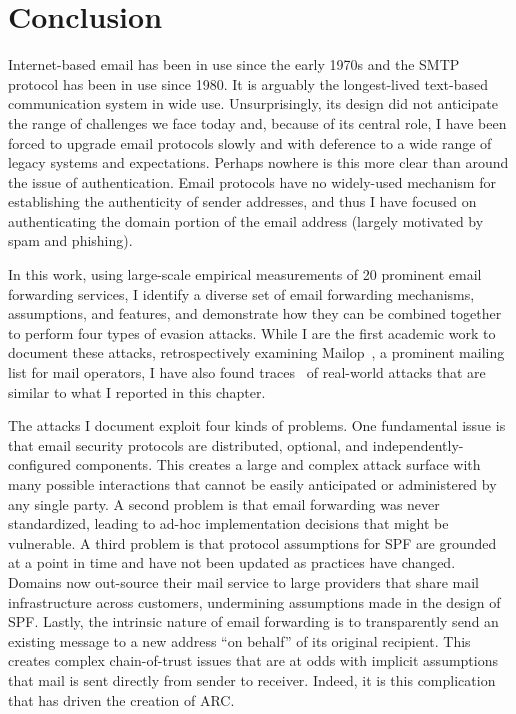 \section{Conclusion}
\label{sec:discussion}
Internet-based email has been in use since the early 1970s
and the SMTP protocol has been in use since 1980.  It is arguably the
longest-lived text-based communication system in wide use.
Unsurprisingly, its design did not anticipate the range of challenges
we face today and, because of its central role, I have been forced
to upgrade email protocols slowly and with deference to a wide range
of legacy systems and expectations. Perhaps nowhere is this more clear
than around the issue of authentication.  Email protocols have no
widely-used mechanism for establishing the authenticity of sender
addresses, and thus I have focused on authenticating the domain
portion of the email address (largely motivated by spam and phishing).

In this work, using large-scale empirical measurements of 20 prominent email forwarding services, I identify a diverse set of email forwarding mechanisms, assumptions, and features, and demonstrate how they can be combined together to perform four types of evasion attacks. While I are the first academic work to document these attacks, retrospectively examining Mailop~\cite{Mailop96:online}, a prominent mailing list for mail operators, I have also found traces~\cite{RealTraces} of real-world attacks that are similar to what I reported in this chapter. 

The attacks I document exploit four kinds of problems. One fundamental issue is that email security protocols are
distributed, optional, and independently-configured components. This creates a large and complex attack surface with many
possible interactions that cannot be easily anticipated or
administered by any single party. A second problem is that email forwarding was never standardized, leading to ad-hoc implementation decisions that might be vulnerable. A third problem is that protocol assumptions for SPF are grounded at a
point in time and have not been updated as practices have changed. Domains now out-source their mail service to large providers that share mail infrastructure across customers, undermining assumptions made in the design of SPF. Lastly, the intrinsic nature of email forwarding is to transparently send an existing message to a new address ``on behalf'' of its original recipient. 
This creates complex chain-of-trust issues that are at odds with implicit assumptions that mail is sent directly from sender to receiver. Indeed, it is this complication that has driven the creation of ARC.


